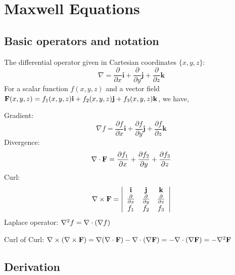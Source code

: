 \section{Maxwell Equations}

\subsection{Basic operators and notation}

The differential operator given in Cartesian coordinates $\{x,y,z\}$: 
\begin{equation}
	\nabla = \frac{\partial}{\partial x}\mathbf{i} + \frac{\partial}{\partial y}\mathbf{j} + \frac{\partial}{\partial z}\mathbf{k}
\end{equation}
For a scalar function $f(x,y,z)$ and a vector field $\mathbf{F}(x,y,z) = f_1(x,y,z)\mathbf{i} + f_2(x,y,z)\mathbf{j} + f_3(x,y,z)\mathbf{k}$, we have,

Gradient:
\begin{equation}
	\nabla f = \frac{\partial f}{\partial x}\mathbf{i} + \frac{\partial f}{\partial y}\mathbf{j} + \frac{\partial f}{\partial z}\mathbf{k}
\end{equation}
Divergence: 
\begin{equation}
	\nabla\cdot\mathbf{F} = \frac{\partial f_1}{\partial x} + \frac{\partial f_2}{\partial y} + \frac{\partial f_3}{\partial z}
\end{equation}
Curl: 
\begin{equation}
	\nabla\times\mathbf{F} = \left|
	\begin{array}{ccc}
		\mathbf{i} & \mathbf{j} & \mathbf{k} \\
		\frac{\partial}{\partial x} & \frac{\partial}{\partial y} & \frac{\partial}{\partial z} \\
		f_1 & f_2 & f_3
	\end{array}
	\right|
\end{equation}	
Laplace operator: $\nabla^2 f = \nabla\cdot(\nabla f)$

Curl of Curl: 
	$\nabla\times(\nabla\times\mathbf{F}) = \nabla(\nabla\cdot\mathbf{F}) - \nabla\cdot(\nabla\mathbf{F}) = - \nabla\cdot(\nabla\mathbf{F}) = -\nabla^2\mathbf{F}$


\subsection{Derivation}

